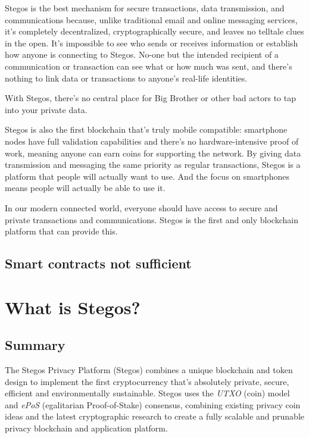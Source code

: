 \documentclass[8pt,fleqn,openany]{book}
\begin{document}
Stegos is the best mechanism for secure transactions, data transmission, and communications because, unlike traditional email and online messaging services, it’s completely decentralized, cryptographically secure, and leaves no telltale clues in the open. It’s impossible to see who sends or receives information or establish how anyone is connecting to Stegos. No-one but the intended recipient of a communication or transaction can see what or how much was sent, and there’s nothing to link data or transactions to anyone’s real-life identities.

With Stegos, there's no central place for Big Brother or other bad actors to tap into your private data.

Stegos is also the first blockchain that's truly mobile compatible: smartphone nodes have full validation capabilities and there's no hardware-intensive proof of work, meaning anyone can earn coins for supporting the network. By giving data transmission and messaging the same priority as regular transactions, Stegos is a platform that people will actually want to use. And the focus on smartphones means people will actually be able to use it.

In our modern connected world, everyone should have access to secure and private transactions and communications. Stegos is the first and only blockchain platform that can provide this.  
	
\section{Smart contracts not sufficient}

\chapter{What is Stegos?}\label{chap:what-is-stegos}

\section{Summary}
The Stegos Privacy Platform (Stegos) combines a unique blockchain and token design to implement the first cryptocurrency that’s absolutely private, secure, efficient and environmentally sustainable. Stegos uses the \textit{UTXO} (coin) model and \textit{ePoS} (egalitarian Proof-of-Stake) consensus, combining existing privacy coin ideas and the latest cryptographic research to create a fully scalable and prunable privacy blockchain and application platform. 
 
\end{document}
